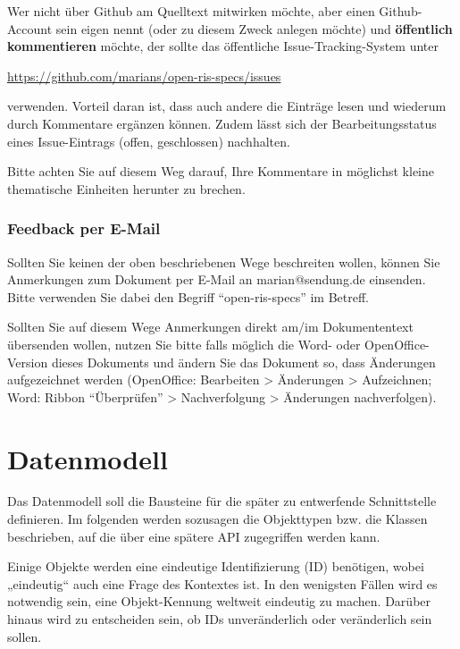 \documentclass[,a4paper]{article}
\begin{document}
Wer nicht über Github am Quelltext mitwirken möchte, aber einen
Github-Account sein eigen nennt (oder zu diesem Zweck anlegen möchte)
und \textbf{öffentlich kommentieren} möchte, der sollte das öffentliche
Issue-Tracking-System unter

\href{https://github.com/marians/open-ris-specs/issues}{https://github.com/marians/open-ris-specs/issues}

verwenden. Vorteil daran ist, dass auch andere die Einträge lesen und
wiederum durch Kommentare ergänzen können. Zudem lässt sich der
Bearbeitungsstatus eines Issue-Eintrags (offen, geschlossen) nachhalten.

Bitte achten Sie auf diesem Weg darauf, Ihre Kommentare in möglichst
kleine thematische Einheiten herunter zu brechen.

\subsubsection{Feedback per E-Mail}

Sollten Sie keinen der oben beschriebenen Wege beschreiten wollen,
können Sie Anmerkungen zum Dokument per E-Mail an marian@sendung.de
einsenden. Bitte verwenden Sie dabei den Begriff ``open-ris-specs'' im
Betreff.

Sollten Sie auf diesem Wege Anmerkungen direkt am/im Dokumententext
übersenden wollen, nutzen Sie bitte falls möglich die Word- oder
OpenOffice-Version dieses Dokuments und ändern Sie das Dokument so, dass
Änderungen aufgezeichnet werden (OpenOffice: Bearbeiten \textgreater{}
Änderungen \textgreater{} Aufzeichnen; Word: Ribbon ``Überprüfen''
\textgreater{} Nachverfolgung \textgreater{} Änderungen nachverfolgen).

\section{Datenmodell}

Das Datenmodell soll die Bausteine für die später zu entwerfende
Schnittstelle definieren. Im folgenden werden sozusagen die Objekttypen
bzw. die Klassen beschrieben, auf die über eine spätere API zugegriffen
werden kann.

Einige Objekte werden eine eindeutige Identifizierung (ID) benötigen,
wobei „eindeutig`` auch eine Frage des Kontextes ist. In den wenigsten
Fällen wird es notwendig sein, eine Objekt-Kennung weltweit eindeutig zu
machen. Darüber hinaus wird zu entscheiden sein, ob IDs unveränderlich
oder veränderlich sein sollen.
\end{document}
